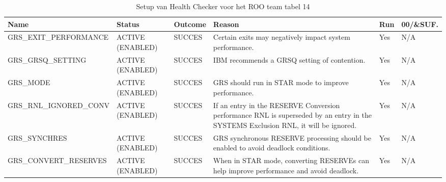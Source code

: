 \begin{landscape}
	\begin{table}[h]
		\begin{tabular}{|l|p{2.3cm}|l|p{4.5cm}|l|l|}
			\hline
			\textbf{Name}                       & \textbf{Status}   & \textbf{Outcome} & \textbf{Reason}    & \textbf{Run} &	\textbf{00/\&SUF.} \\ \hline
			GRS\_EXIT\_PERFORMANCE  & ACTIVE   (ENABLED) & SUCCES & Certain   exits may negatively impact system performance.                                                                             & Yes & N/A \\ \hline
			GRS\_GRSQ\_SETTING      & ACTIVE   (ENABLED) & SUCCES & IBM   recommends a GRSQ setting of contention.                                                                                        & Yes & N/A \\ \hline
			GRS\_MODE               & ACTIVE   (ENABLED) & SUCCES & GRS   should run in STAR mode to improve performance.                                                                                 & Yes & N/A \\ \hline
			GRS\_RNL\_IGNORED\_CONV & ACTIVE   (ENABLED) & SUCCES & If an   entry in the RESERVE Conversion performance RNL is superseded by an entry in   the SYSTEMS Exclusion RNL, it will be ignored. & Yes & N/A \\ \hline
			GRS\_SYNCHRES           & ACTIVE   (ENABLED) & SUCCES & GRS   synchronous RESERVE processing should be enabled to avoid deadlock   conditions.                                                & Yes & N/A \\ \hline
			GRS\_CONVERT\_RESERVES  & ACTIVE (ENABLED)    & SUCCES & When in   STAR mode, converting RESERVEs can help improve performance and avoid   deadlock.                                           & Yes & N/A \\ \hline
		\end{tabular}
		\caption[Health Checker ROO team tabel 14]{Setup van Health Checker voor het ROO team tabel 14}
		\label{tbl:ROO Team Tabel 14}
	\end{table}
\end{landscape}

